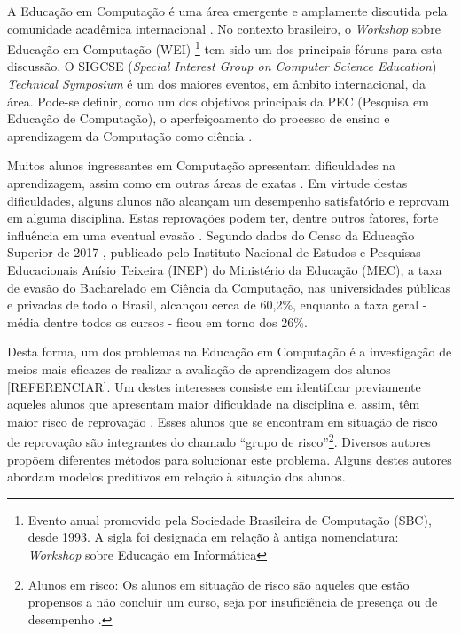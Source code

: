A Educação em Computação é uma área emergente e amplamente discutida pela comunidade acadêmica internacional \cite{fincher2005mapping}. No contexto brasileiro, o \textit{Workshop} sobre Educação em Computação (WEI) \footnote{Evento anual promovido pela Sociedade Brasileira de Computação (SBC), desde 1993. A sigla foi designada em relação à antiga nomenclatura: \textit{Workshop} sobre Educação em Informática} tem sido um dos principais fóruns para esta discussão. O SIGCSE (\textit{Special Interest Group on Computer Science Education}) \textit{Technical Symposium} é um dos maiores eventos, em âmbito internacional, da área. Pode-se definir, como um dos objetivos principais da PEC (Pesquisa em Educação de Computação), o aperfeiçoamento do processo de ensino e aprendizagem da Computação como ciência \cite{holmboe2001research}.

Muitos alunos ingressantes em Computação apresentam dificuldades na aprendizagem, assim como em outras áreas de exatas \cite{blando2015dificuldades}. Em virtude destas dificuldades, alguns alunos não alcançam um desempenho satisfatório e reprovam em alguma disciplina. Estas reprovações podem ter, dentre outros fatores, forte influência em uma eventual evasão \cite{evasaoMatheus2014}. Segundo dados do Censo da Educação Superior de 2017 \cite{Inep2017}, publicado pelo Instituto Nacional de Estudos e Pesquisas Educacionais Anísio Teixeira (INEP) do Ministério da Educação (MEC), a taxa de evasão do Bacharelado em Ciência da Computação, nas universidades públicas e privadas de todo o Brasil, alcançou cerca de 60,2\%, enquanto a taxa geral - média dentre todos os cursos - ficou em torno dos 26\%.

Desta forma, um dos problemas na Educação em Computação é a investigação de meios mais eficazes de realizar a avaliação de aprendizagem dos alunos {\color{red}[REFERENCIAR]}. Um destes interesses consiste em identificar previamente aqueles alunos que apresentam maior dificuldade na disciplina e, assim, têm maior risco de reprovação \cite{martins2012assistente}. Esses alunos que se encontram em situação de risco de reprovação são integrantes do chamado ``grupo de risco''\footnote[1]{Alunos em risco: Os alunos em situação de risco são aqueles que estão propensos a não concluir um curso, seja por insuficiência de presença ou de desempenho \cite{da2014alunos}.}. Diversos autores propõem diferentes métodos para solucionar este problema. Alguns destes autores abordam modelos preditivos em relação à situação dos alunos.

